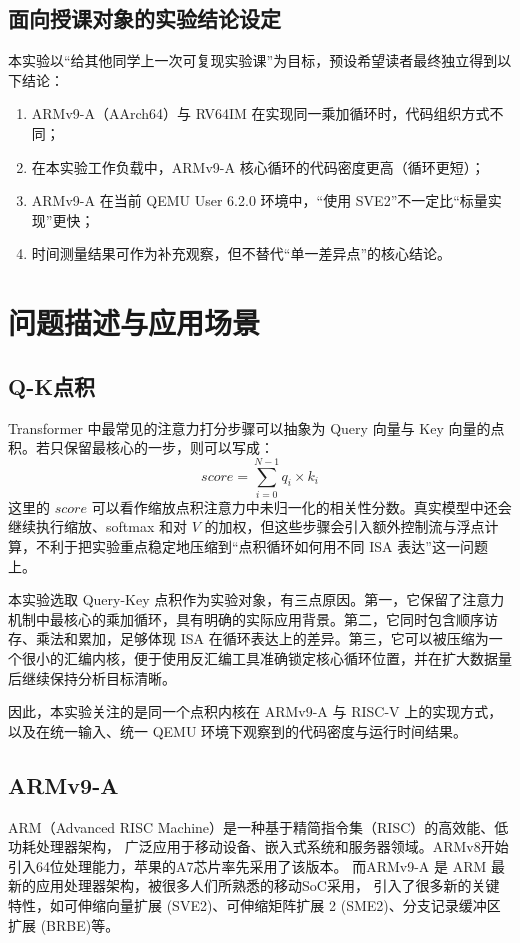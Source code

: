 \documentclass{article}
\begin{document}
\subsection{面向授课对象的实验结论设定}
本实验以“给其他同学上一次可复现实验课”为目标，预设希望读者最终独立得到以下结论：
\begin{enumerate}
    \item ARMv9-A（AArch64）与 RV64IM 在实现同一乘加循环时，代码组织方式不同；
    \item 在本实验工作负载中，ARMv9-A 核心循环的代码密度更高（循环更短）；
    \item ARMv9-A 在当前 QEMU User 6.2.0 环境中，“使用 SVE2”不一定比“标量实现”更快；
    \item 时间测量结果可作为补充观察，但不替代“单一差异点”的核心结论。
\end{enumerate}

\section{问题描述与应用场景}
\subsection{Q-K点积}
Transformer 中最常见的注意力打分步骤可以抽象为 Query 向量与 Key 向量的点积。若只保留最核心的一步，则可以写成：
\[
    score = \sum_{i=0}^{N-1} q_i \times k_i
\]
这里的 $score$ 可以看作缩放点积注意力中未归一化的相关性分数。真实模型中还会继续执行缩放、softmax 和对 $V$ 的加权，但这些步骤会引入额外控制流与浮点计算，不利于把实验重点稳定地压缩到“点积循环如何用不同 ISA 表达”这一问题上。

本实验选取 Query-Key 点积作为实验对象，有三点原因。第一，它保留了注意力机制中最核心的乘加循环，具有明确的实际应用背景。第二，它同时包含顺序访存、乘法和累加，足够体现 ISA 在循环表达上的差异。第三，它可以被压缩为一个很小的汇编内核，便于使用反汇编工具准确锁定核心循环位置，并在扩大数据量后继续保持分析目标清晰。

因此，本实验关注的是同一个点积内核在 ARMv9-A 与 RISC-V 上的实现方式，以及在统一输入、统一 QEMU 环境下观察到的代码密度与运行时间结果。

\subsection{ARMv9-A}
ARM（Advanced RISC Machine）是一种基于精简指令集（RISC）的高效能、低功耗处理器架构，
广泛应用于移动设备、嵌入式系统和服务器领域。ARMv8开始引入64位处理能力，苹果的A7芯片率先采用了该版本。
而ARMv9-A 是 ARM 最新的应用处理器架构，被很多人们所熟悉的移动SoC采用，
引入了很多新的关键特性，如可伸缩向量扩展 (SVE2)、可伸缩矩阵扩展 2 (SME2)、分支记录缓冲区扩展 (BRBE)等。
\end{document}
